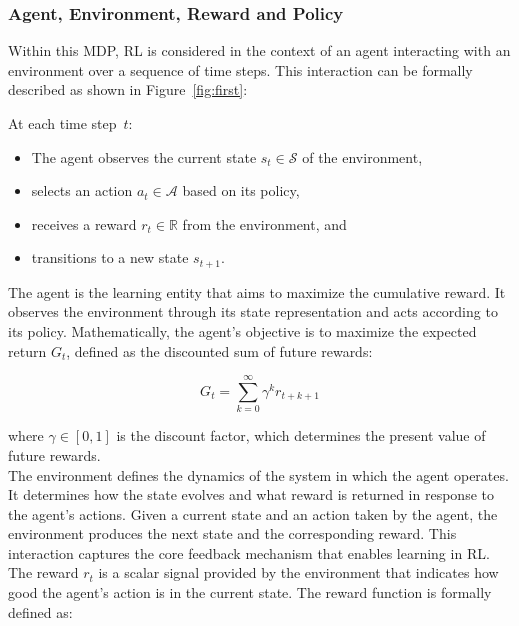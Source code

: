 \subsubsection{Agent, Environment, Reward and Policy}

Within this \gls{MDP}, \gls{RL} is considered in the context of an agent interacting with an environment over a sequence of time steps. This interaction can be formally described as shown in Figure~\ref{fig:first}:

\noindent At each time step~$t$:
\begin{itemize}
    \item The agent observes the current state $s_t \in \mathcal{S}$ of the environment,
    \item selects an action $a_t \in \mathcal{A}$ based on its policy,
    \item receives a reward $r_t \in \mathbb{R}$ from the environment, and
    \item transitions to a new state $s_{t+1}$.
\end{itemize}

\noindent The agent is the learning entity that aims to maximize the cumulative reward. It observes the environment through its state representation and acts according to its policy. Mathematically, the agent's objective is to maximize the expected return $G_t$, defined as the discounted sum of future rewards:

\begin{equation}
G_t = \sum_{k=0}^{\infty} \gamma^k r_{t+k+1}
\end{equation}

\noindent where $\gamma \in [0,1]$ is the discount factor, which determines the present value of future rewards.\\

\noindent The environment defines the dynamics of the system in which the agent operates. It determines how the state evolves and what reward is returned in response to the agent’s actions. Given a current state and an action taken by the agent, the environment produces the next state and the corresponding reward. This interaction captures the core feedback mechanism that enables learning in \gls{RL}.\\

\noindent The reward \( r_t \) is a scalar signal provided by the environment that indicates how good the agent’s action is in the current state. The reward function is formally defined as:


